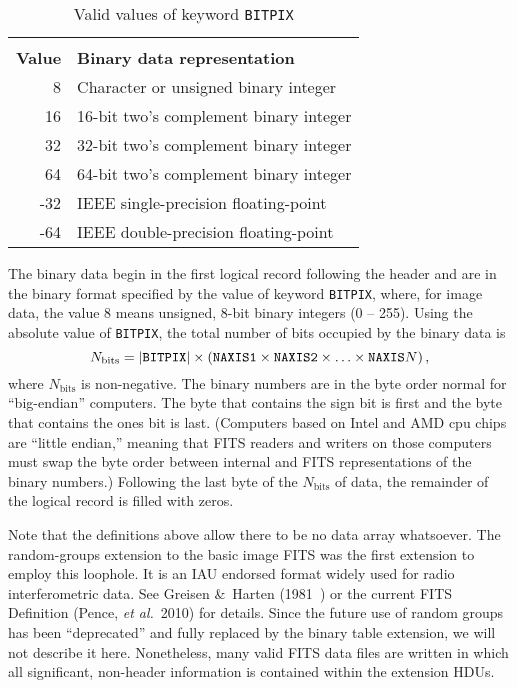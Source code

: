 \documentclass[twoside]{article}
\newcommand{\etal}{{\it et al.}}
\newcommand{\tablerowgapbefore}{-1ex}
\newcommand{\tablerowgapafter}{1ex}
\newcommand{\keyw}[1]{\hbox{{\tt #1}}}
\newcommand{\sub}[1]{_\mathrm{#1}}
\begin{document}
\begin{table}
\caption{Valid values of keyword \keyw{BITPIX}}
\label{tab:data.bitpix}
\begin{center}
\begin{tabular}{|rl|}
\cline{1-2}
& \\ [\tablerowgapbefore]
{\bf Value} & {\bf Binary data representation} \\ [\tablerowgapafter]
  8 & Character or unsigned binary integer \\
 16 & 16-bit two's complement binary integer \\
 32 & 32-bit two's complement binary integer \\
 64 & 64-bit two's complement binary integer \\
-32 & IEEE single-precision floating-point \\
-64 & IEEE double-precision floating-point \\
[\tablerowgapafter] \cline{1-2}
\end{tabular}
\end{center}
\end{table}

The binary data begin in the first logical record following the header
and are in the binary format specified by the value of keyword
\keyw{BITPIX}, where, for image data, the value 8 means unsigned,
8-bit binary integers (0 -- 255).  Using the absolute value of
\keyw{BITPIX}, the total number of bits occupied by the binary data is
\begin{equation}
N\sub{bits} = | \keyw{BITPIX} | \times ( \keyw{NAXIS1} \times
  \keyw{NAXIS2} \times \ldots \times \keyw{NAXIS}N ) \, ,
\end{equation}
where $N\sub{bits}$ is non-negative.  The binary numbers are in the
byte order normal for ``big-endian'' computers.  The byte that
contains the sign bit is first and the byte that contains the ones bit
is last.  (Computers based on Intel and AMD cpu chips are ``little
endian,'' meaning that FITS readers and writers on those computers
must swap the byte order between internal and FITS representations of
the binary numbers.)  Following the last byte of the $N\sub{bits}$ of
data, the remainder of the logical record is filled with zeros.

Note that the definitions above allow there to be no data array
whatsoever.  The random-groups extension to the basic image FITS was
the first extension to employ this loophole.  It is an IAU endorsed
format widely used for radio interferometric data.  See Greisen \&\
Harten (1981~\cite{GH81}) or the current FITS Definition (Pence,
\etal~2010) for details.  Since the future use of random groups has
been ``deprecated'' and fully replaced by the binary table extension,
we  will not describe it here.  Nonetheless, many valid FITS data
files are written in which all significant, non-header information is
contained within the extension HDUs.
\end{document}
